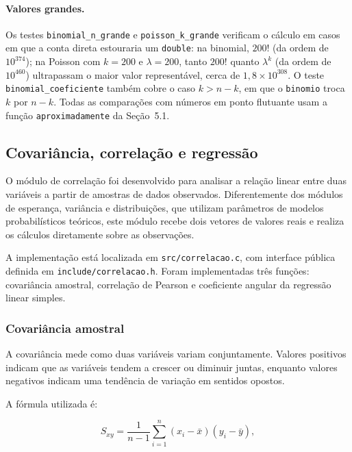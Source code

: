 \documentclass[12pt,a4paper]{article}
\newcommand{\cod}[1]{\texttt{#1}}
\begin{document}
\paragraph{Valores grandes.} Os testes \cod{binomial\_n\_grande} e
\cod{poisson\_k\_grande} verificam o cálculo em casos em que a conta direta
estouraria um \cod{double}: na binomial, $200!$ (da ordem de $10^{374}$); na
Poisson com $k = 200$ e $\lambda = 200$, tanto $200!$ quanto $\lambda^{k}$ (da
ordem de $10^{460}$) ultrapassam o maior valor representável, cerca de
$1{,}8 \times 10^{308}$. O teste \cod{binomial\_coeficiente} também cobre o caso
$k > n-k$, em que o \cod{binomio} troca $k$ por $n-k$. Todas as comparações com
números em ponto flutuante usam a função \cod{aproximadamente} da
Seção~5.1.

\emergencystretch=0pt

\subsection{Covariância, correlação e regressão}

O módulo de correlação foi desenvolvido para analisar a relação linear entre
duas variáveis a partir de amostras de dados observados. Diferentemente dos
módulos de esperança, variância e distribuições, que utilizam parâmetros
de modelos probabilísticos teóricos, este módulo recebe dois vetores de
valores reais e realiza os cálculos diretamente sobre as observações.

A implementação está localizada em \cod{src/correlacao.c}, com interface
pública definida em \cod{include/correlacao.h}. Foram implementadas três
funções: covariância amostral, correlação de Pearson e coeficiente angular
da regressão linear simples.

\subsubsection{Covariância amostral}

A covariância mede como duas variáveis variam conjuntamente. Valores
positivos indicam que as variáveis tendem a crescer ou diminuir juntas,
enquanto valores negativos indicam uma tendência de variação em sentidos
opostos.

A fórmula utilizada é:

\begin{equation}
S_{xy} =
\frac{1}{n-1}
\sum_{i=1}^{n}(x_i-\bar{x})(y_i-\bar{y}),
\end{equation}
\end{document}
